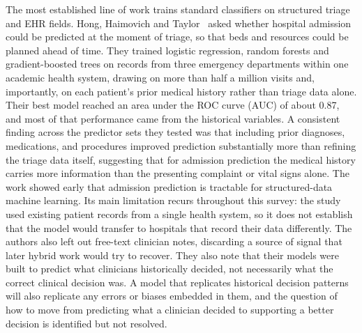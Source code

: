 \documentclass[11pt]{article}
\begin{document}
The most established line of work trains standard classifiers on structured triage and EHR fields. Hong, Haimovich and Taylor~\cite{Hong2018PredictingHA} asked whether hospital admission could be predicted at the moment of triage, so that beds and resources could be planned ahead of time. They trained logistic regression, random forests and gradient-boosted trees on records from three emergency departments within one academic health system, drawing on more than half a million visits and, importantly, on each patient's prior medical history rather than triage data alone. Their best model reached an area under the ROC curve (AUC) of about 0.87, and most of that performance came from the historical variables. A consistent finding across the predictor sets they tested was that including prior diagnoses, medications, and procedures improved prediction substantially more than refining the triage data itself, suggesting that for admission prediction the medical history carries more information than the presenting complaint or vital signs alone. The work showed early that admission prediction is tractable for structured-data machine learning. Its main limitation recurs throughout this survey: the study used existing patient records from a single health system, so it does not establish that the model would transfer to hospitals that record their data differently. The authors also left out free-text clinician notes, discarding a source of signal that later hybrid work would try to recover. They also note that their models were built to predict what clinicians historically decided, not necessarily what the correct clinical decision was. A model that replicates historical decision patterns will also replicate any errors or biases embedded in them, and the question of how to move from predicting what a clinician decided to supporting a better decision is identified but not resolved.
\end{document}
